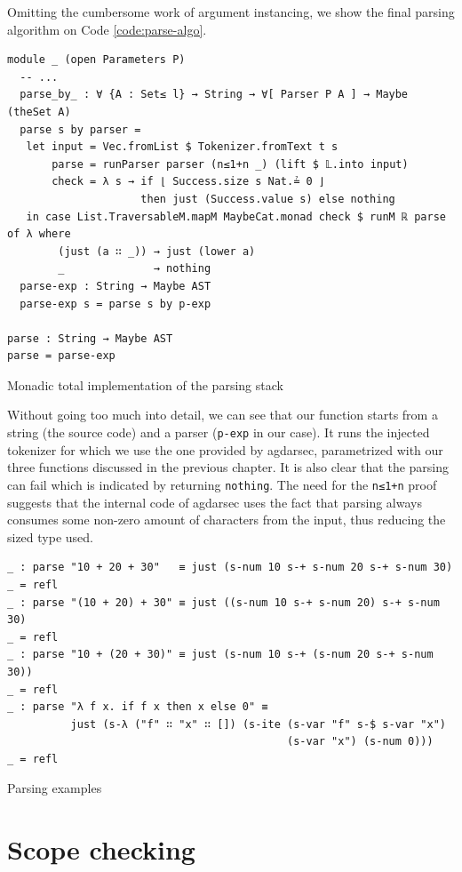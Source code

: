 Omitting the cumbersome work of argument instancing, we show the final parsing algorithm on Code \ref{code:parse-algo}.

\begin{listing}[H]
\begin{verbatim}
module _ (open Parameters P)
  -- ...
  parse_by_ : ∀ {A : Set≤ l} → String → ∀[ Parser P A ] → Maybe (theSet A)
  parse s by parser =
   let input = Vec.fromList $ Tokenizer.fromText t s
       parse = runParser parser (n≤1+n _) (lift $ 𝕃.into input)
       check = λ s → if ⌊ Success.size s Nat.≟ 0 ⌋
                     then just (Success.value s) else nothing
   in case List.TraversableM.mapM MaybeCat.monad check $ runM ℝ parse of λ where
        (just (a ∷ _)) → just (lower a)
        _              → nothing
  parse-exp : String → Maybe AST
  parse-exp s = parse s by p-exp

parse : String → Maybe AST
parse = parse-exp
\end{verbatim}
\caption{Monadic total implementation of the parsing stack}
\label{code:parse-algo}
\end{listing}

Without going too much into detail, we can see that our function starts from a string (the source code) and a parser (\verb$p-exp$ in our case). It runs the injected tokenizer for which we use the one provided by agdarsec, parametrized with our three functions discussed in the previous chapter. It is also clear that the parsing can fail which is indicated by returning \verb$nothing$. The need for the \verb$n≤1+n$ proof suggests that the internal code of agdarsec uses the fact that parsing always consumes some non-zero amount of characters from the input, thus reducing the sized type used.

\begin{listing}[H]
\begin{verbatim}
_ : parse "10 + 20 + 30"   ≡ just (s-num 10 s-+ s-num 20 s-+ s-num 30)
_ = refl
_ : parse "(10 + 20) + 30" ≡ just ((s-num 10 s-+ s-num 20) s-+ s-num 30)
_ = refl
_ : parse "10 + (20 + 30)" ≡ just (s-num 10 s-+ (s-num 20 s-+ s-num 30))
_ = refl
_ : parse "λ f x. if f x then x else 0" ≡
          just (s-λ ("f" ∷ "x" ∷ []) (s-ite (s-var "f" s-$ s-var "x")
                                            (s-var "x") (s-num 0)))
_ = refl
\end{verbatim}
\caption{Parsing examples}
\label{code:parse-examples}
\end{listing}

\section{Scope checking}

